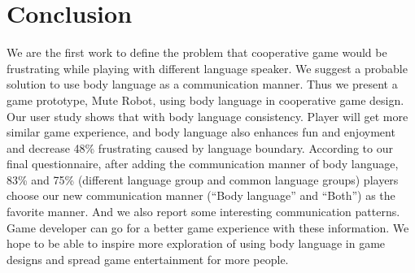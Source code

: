 \section{Conclusion}



We are the first work to define the problem that cooperative game would be frustrating while playing with different language speaker. We suggest a probable solution to use body language as a communication manner. Thus we present a game prototype, Mute Robot, using body language in cooperative game design. Our user study shows that with body language consistency. Player will get more similar game experience, and body language also enhances fun and enjoyment and decrease 48\% frustrating caused by language boundary. According to our final questionnaire, 
after adding the communication manner of body language, 83\% and 75\% (different language group and common language groups) players choose our new communication manner (``Body language'' and ``Both'') as the favorite manner. 
And we also report some interesting communication patterns. Game developer can go for a better game experience with these information. We hope to be able to inspire more exploration of using body language in game designs and spread game entertainment for more people.



